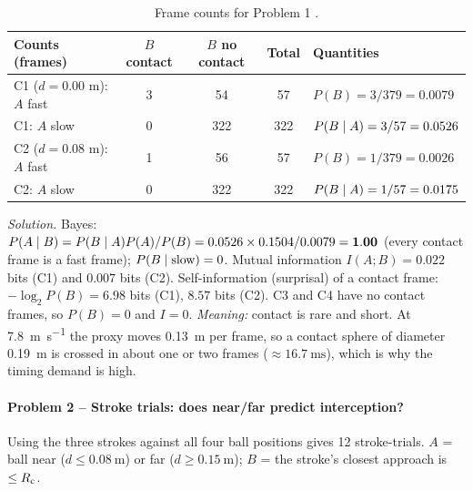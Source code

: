 \begin{table}[ht]
    \centering
    \caption{Frame counts for Problem 1 \tagsim.}\label{tab:p1}
    \footnotesize
    \begin{tabular}{@{}l c c c l@{}}
        \toprule
        \textbf{Counts (frames)}  & \textbf{$B$ contact} & \textbf{$B$ no contact} & \textbf{Total} & \textbf{Quantities}        \\
        \midrule
        C1 ($d=0.00$ m): $A$ fast & 3                    & 54                      & 57             & $P(B)=3/379=0.0079$        \\
        C1: $A$ slow              & 0                    & 322                     & 322            & $P(B\mid A)=3/57=0.0526$ \\
        C2 ($d=0.08$ m): $A$ fast & 1                    & 56                      & 57             & $P(B)=1/379=0.0026$        \\
        C2: $A$ slow              & 0                    & 322                     & 322            & $P(B\mid A)=1/57=0.0175$ \\
        \bottomrule
    \end{tabular}
\end{table}

\emph{Solution.} Bayes: $P(A\mid B)=P(B\mid A)P(A)/P(B)=0.0526\times0.1504/0.0079=\mathbf{1.00}$ (every contact frame is a fast frame); $P(B\mid\text{slow})=0$. Mutual information $I(A;B)=\mathbf{0.022}$ bits (C1) and $\mathbf{0.007}$ bits (C2). Self-information (surprisal) of a contact frame: $-\log_2P(B)=\mathbf{6.98}$ bits (C1), $\mathbf{8.57}$ bits (C2). C3 and C4 have no contact frames, so $P(B)=0$ and $I=0$. \emph{Meaning:} contact is rare and short. At \SI{7.8}{\meter\per\second} the proxy moves \SI{0.13}{\meter} per frame, so a contact sphere of diameter \SI{0.19}{\meter} is crossed in about one or two frames ($\approx\SI{16.7}{\milli\second}$), which is why the timing demand is high.

\paragraph{Problem 2 -- Stroke trials: does near/far predict interception?} Using the three strokes against all four ball positions gives 12 stroke-trials. $A$ = ball near ($d\le\SI{0.08}{\meter}$) or far ($d\ge\SI{0.15}{\meter}$); $B$ = the stroke's closest approach is $\le R_{\mathrm{c}}$.

